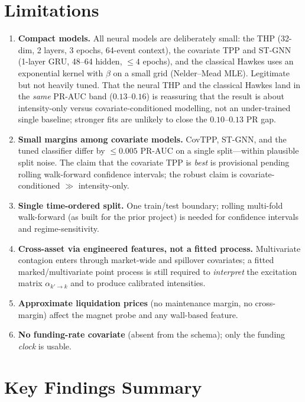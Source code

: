 \documentclass[11pt,a4paper]{article}
\begin{document}
\section{Limitations}

\begin{enumerate}[nosep]
    \item \textbf{Compact models.} All neural models are deliberately small: the THP (32-dim, 2 layers, 3 epochs, 64-event context), the covariate TPP and ST-GNN (1-layer GRU, 48--64 hidden, $\le 4$ epochs), and the classical Hawkes uses an exponential kernel with $\beta$ on a small grid (Nelder--Mead MLE). Legitimate but not heavily tuned. That the neural THP and the classical Hawkes land in the \emph{same} PR-AUC band ($0.13$--$0.16$) is reassuring that the result is about intensity-only versus covariate-conditioned modelling, not an under-trained single baseline; stronger fits are unlikely to close the $0.10$--$0.13$ PR gap.
    \item \textbf{Small margins among covariate models.} CovTPP, ST-GNN, and the tuned classifier differ by $\le 0.005$ PR-AUC on a single split---within plausible split noise. The claim that the covariate TPP is \emph{best} is provisional pending rolling walk-forward confidence intervals; the robust claim is covariate-conditioned $\gg$ intensity-only.
    \item \textbf{Single time-ordered split.} One train/test boundary; rolling multi-fold walk-forward (as built for the prior project) is needed for confidence intervals and regime-sensitivity.
    \item \textbf{Cross-asset via engineered features, not a fitted process.} Multivariate contagion enters through market-wide and spillover covariates; a fitted marked/multivariate point process is still required to \emph{interpret} the excitation matrix $\alpha_{k'\to k}$ and to produce calibrated intensities.
    \item \textbf{Approximate liquidation prices} (no maintenance margin, no cross-margin) affect the magnet probe and any wall-based feature.
    \item \textbf{No funding-rate covariate} (absent from the schema); only the funding \emph{clock} is usable.
\end{enumerate}

\section{Key Findings Summary}
\end{document}
